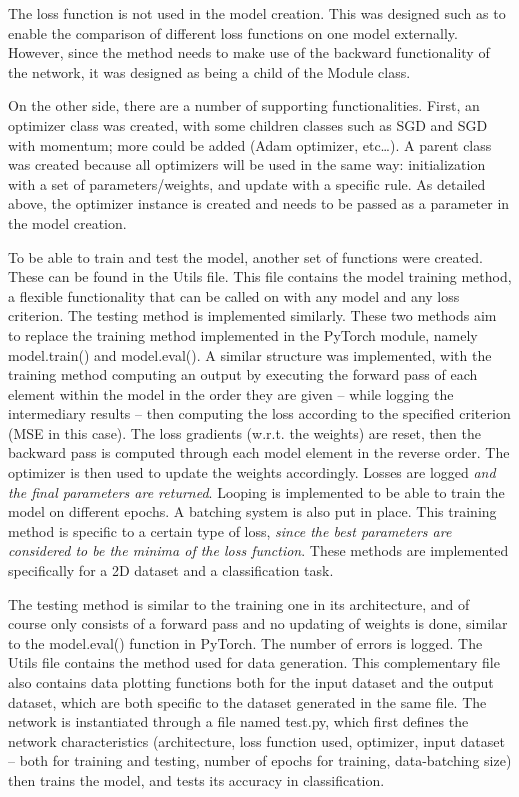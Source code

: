 \documentclass[10pt, a4paper]{article}
\begin{document}
The loss function is not used in the model creation. This was designed such as to enable the comparison of different loss functions on one model externally. However, since the method needs to make use of the backward functionality of the network, it was designed as being a child of the Module class.

On the other side, there are a number of supporting functionalities. First, an optimizer class was created, with some children classes such as SGD and SGD with momentum; more could be added (Adam optimizer, etc…). A parent class was created because all optimizers will be used in the same way: initialization with a set of parameters/weights, and update with a specific rule. As detailed above, the optimizer instance is created and needs to be passed as a parameter in the model creation.

To be able to train and test the model, another set of functions were created. These can be found in the Utils file. This file contains the model training method, a flexible functionality that can be called on with any model and any loss criterion. The testing method is implemented similarly. These two methods aim to replace the training method implemented in the PyTorch module, namely model.train() and model.eval(). A similar structure was implemented, with the training method computing an output by executing the forward pass of each element within the model in the order they are given -- while logging the intermediary results -- then computing the loss according to the specified criterion (MSE in this case). The loss gradients (w.r.t. the weights) are reset, then the backward pass is computed through each model element in the reverse order. The optimizer is then used to update the weights accordingly. Losses are logged \textit{and the final parameters are returned}. Looping is implemented to be able to train the model on different epochs. A batching system is also put in place. This training method is specific to a certain type of loss, \textit{since the best parameters are considered to be the minima of the loss function}. These methods are implemented specifically for a 2D dataset and a classification task.

The testing method is similar to the training one in its architecture, and of course only consists of a forward pass and no updating of weights is done, similar to the model.eval() function in PyTorch. The number of errors is logged. 
The Utils file contains the method used for data generation. This complementary file also contains data plotting functions both for the input dataset and the output dataset, which are both specific to the dataset generated in the same file.
The network is instantiated through a file named test.py, which first defines the network characteristics (architecture, loss function used, optimizer, input dataset -- both for training and testing, number of epochs for training, data-batching size) then trains the model, and tests its accuracy in classification. 
\end{document}
